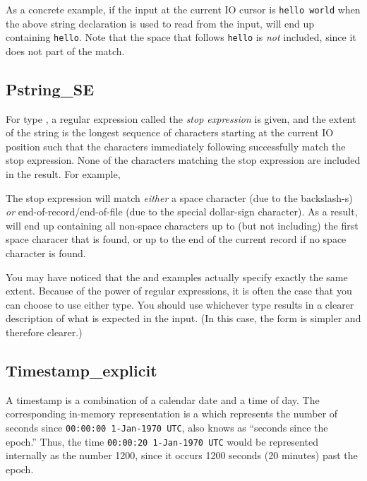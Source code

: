 As a concrete example, if the input at the current IO cursor is {\tt hello
world} when the above string declaration is used to read from the
input,  will end up containing {\tt hello}.  Note that the
space that follows {\tt hello} is {\em not} included, since it does not
part of the match.

\subsection{Pstring\_SE}

\aedBegin{}
\aedEnd{}

For type , a regular expression called the {\em stop
expression\/} is given, and the extent of the string is the longest
sequence of characters starting at the current IO position such that
the characters immediately following successfully match the stop
expression.  None of the characters matching the stop expression
are included in the result.
For example,

%
\noindent
The stop expression will match {\em either\/} a space character (due to the backslash-s) {\em or\/}
end-of-record/end-of-file (due to the special dollar-sign character).  As a result,
 will end up containing all non-space characters up to (but not including) the 
first space characer that is found, or up to the end of the current record if no space
character is found.  

You may have noticed that the  and
 examples actually specify exactly the same extent.  
Because of the power of regular expressions, it is often the case that you can
choose to use either type.  You should use whichever type results in a
clearer description of what is expected in the input.  (In this case,
the form is simpler and therefore clearer.)

\subsection{Timestamp\_explicit}

\begin{small}
\aedBegin{}
\aedEnd{}
\end{small}

\noindent
A timestamp is a combination of a calendar date and a time of day.
The corresponding in-memory representation is a  which
represents the number of seconds since {\tt 00:00:00 1-Jan-1970 UTC},
also knows as ``seconds since the epoch.''
Thus, the time {\tt 00:00:20 1-Jan-1970 UTC} would be represented
internally as the number 1200, since it occurs 1200 seconds
(20 minutes) past the epoch.

